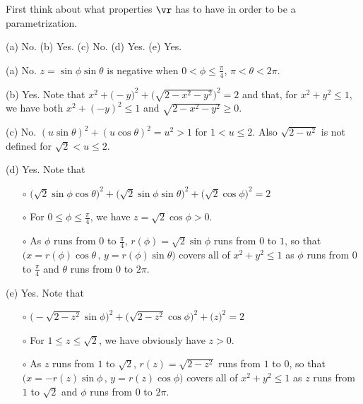 \begin{hint} 
First think about what properties $\vr$ has to have in order to be
a parametrization.
\end{hint}

\begin{answer} 
(a) No.\qquad
(b) Yes.\qquad
(c) No.\qquad
(d) Yes.\qquad
(e) Yes.
\end{answer}

\begin{solution} 
(a) No. $z=\sin\phi\sin \theta$ is negative when 
$0 <\phi\le\frac{\pi}{4}$, $\pi < \theta <2\pi$.

(b) Yes. Note that $x^2+\big(-y\big)^2+\big(\sqrt{2-x^2-y^2}\big)^2=2$
and that, for $x^2+y^2\le 1$, we have both $x^2+(-y)^2\le 1$ and
$\sqrt{2-x^2-y^2}\ge 0$.

(c) No. $(u\sin\theta)^2+(u\cos\theta)^2=u^2>1$ for $1<u\le 2$.
Also $\sqrt{2-u^2}$ is not defined for $\sqrt{2}<u\le 2$.

(d) Yes. Note that
\begin{itemize}\itemsep1pt \parskip0pt  %
\item[$\circ$]
$\big(\sqrt{2}\sin \phi\cos\theta\big)^2
 +\big(\sqrt{2}\sin \phi\sin\theta\big)^2
 +\big(\sqrt{2}\cos \phi\big)^2=2$
\item[$\circ$]
For $0\le\phi\le\frac{\pi}{4}$, we have $z=\sqrt{2}\cos \phi>0$.

\item[$\circ$]
As $\phi$ runs from $0$ to $\frac{\pi}{4}$, $r(\phi)=\sqrt{2}\sin\phi$
runs from $0$ to $1$, so that 
        $\big(x=r(\phi)\cos\theta\,,\,y=r(\phi)\sin\theta\big)$
covers all of $x^2+y^2\le1$ as $\phi$ runs from $0$ to $\frac{\pi}{4}$
and $\theta$ runs from $0$ to $2\pi$.

\end{itemize}

(e)
Yes. Note that
\begin{itemize}\itemsep1pt \parskip0pt  %
\item[$\circ$]
$\big(-\sqrt{2-z^2}\sin \phi\big)^2
 +\big(\sqrt{2-z^2}\cos \phi\big)^2
 +\big(z\big)^2=2$
\item[$\circ$]
For $1\le z\le\sqrt{2}$, we have obviously have $z>0$.

\item[$\circ$]
As $z$ runs from $1$ to $\sqrt{2}$, $r(z)=\sqrt{2-z^2}$
runs from $1$ to $0$, so that $\big(x=-r(z)\sin\phi\,,\,y=r(z)\cos\phi\big)$
covers all of $x^2+y^2\le1$ as $z$ runs from $1$ to $\sqrt{2}$
and $\phi$ runs from $0$ to $2\pi$.

\end{itemize}
\end{solution}

